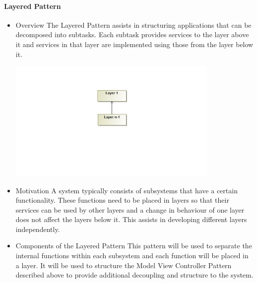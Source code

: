 \documentclass{article}
\begin{document}
			\paragraph{Layered Pattern}
				\begin{itemize}
\item{Overview}
\newline
The Layered Pattern assists in structuring applications that can be decomposed into subtasks. Each subtask provides services to the layer above it and services in that layer are implemented using those from the layer below it.
\newline
\begin{minipage}{\linewidth} 
\centering
\includegraphics[width=4in]{../Diagrams/ArchitecturalPatterns/LayeredPattern.jpg}
\end{minipage}
\item{Motivation}
\newline
A system typically consists of subsystems that have a certain functionality. These functions need to be placed in layers so that their services can be used by other layers and a change in behaviour of one layer does not affect the layers below it. This assists in developing different layers independently. 

\item{Components of the Layered Pattern}
\newline
This pattern will be used to separate the internal functions within each subsystem and each function will be placed in a layer. It will be used to structure the Model View Controller Pattern described above to provide additional decoupling and structure to the system.
\newline

\end{itemize}
\end{document}
